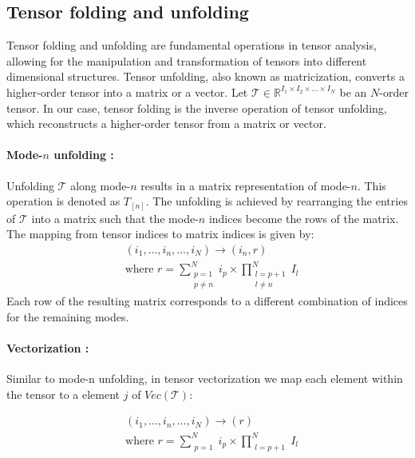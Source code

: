 \documentclass{article}
\begin{document}
\subsection{Tensor folding and unfolding}
\label{subsec:tensor-folding-unfolding}

Tensor folding and unfolding are fundamental operations in tensor analysis, allowing for the manipulation and transformation of tensors into different dimensional structures.
Tensor unfolding, also known as matricization, converts a higher-order tensor into a matrix or a vector. Let $\mathcal{T} \in \mathbb{R}^{I_1 \times I_2 \times \ldots \times I_N}$ be an $N$-order tensor. In our case, tensor folding is the inverse operation of tensor unfolding, which reconstructs a higher-order tensor from a matrix or vector. 

\paragraph{Mode-$n$ unfolding :}
\label{par:mode-n-unfolding}

Unfolding $\mathcal{T}$ along mode-$n$ \cite{r4} results in a matrix representation of mode-$n$. This operation is denoted as $T_{[n]}$. The unfolding is achieved by rearranging the entries of $\mathcal{T}$ into a matrix such that the mode-$n$ indices become the rows of the matrix. The mapping from tensor indices to matrix indices is given by:
\begin{align}
	\label{eq:unfolding}
	&(i_1, \dots, i_n,\dots,i_N) \longrightarrow (i_n,r) \nonumber\\ 
	&\text{where } r = \sum_{\substack{p=1 \\ p\neq n}}^{N} i_p \times \prod_{\substack{l=p+1 \\ l\neq n}}^{N} I_l
\end{align}
Each row of the resulting matrix corresponds to a different combination of indices for the remaining modes.

\paragraph{Vectorization : }
\label{par:vectorization}
Similar to mode-n unfolding, in tensor vectorization \cite{r4} we map each element within the tensor to a element $j$ of $Vec(\mathcal{T})$:

\begin{align}
	\label{eq:vectorization}
	&(i_1, \dots, i_n,\dots,i_N) \longrightarrow (r) \nonumber\\ 
	&\text{where } r = \sum_{\substack{p=1}}^{N} i_p \times \prod_{\substack{l=p+1}}^{N} I_l
\end{align}
\end{document}

